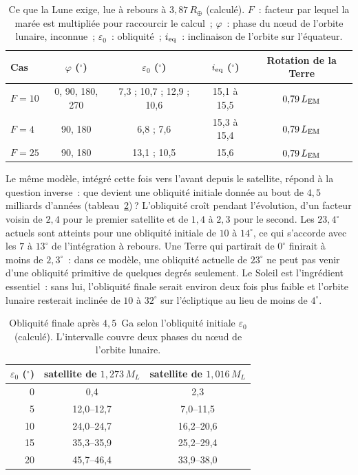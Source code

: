 \documentclass[11pt,a4paper]{article}
\newcommand{\Rt}{\ensuremath{R_\oplus}}
\newcommand{\ML}{\ensuremath{M_L}}
\newcommand{\LEM}{\ensuremath{L_{\rm EM}}}
\begin{document}
\begin{table}[htbp]
\centering
\caption{Ce que la Lune exige, lue à rebours à $3{,}87\,\Rt$ (calculé). $F$~: facteur par lequel la marée est multipliée pour raccourcir le calcul~; $\varphi$~: phase du nœud de l'orbite lunaire, inconnue~; $\varepsilon_0$~: obliquité~; $i_{\rm eq}$~: inclinaison de l'orbite sur l'équateur.\label{tab:retro}}
\small
\begin{tabular}{lcccc}
\toprule
Cas & $\varphi$ ($^\circ$) & $\varepsilon_0$ ($^\circ$) & $i_{\rm eq}$ ($^\circ$) & Rotation de la Terre \\
\midrule
$F=10$ & 0, 90, 180, 270 & 7,3 ; 10,7 ; 12,9 ; 10,6 & 15,1 à 15,5 & $0{,}79\,\LEM$ \\
$F=4$ & 90, 180 & 6,8 ; 7,6 & 15,3 à 15,4 & $0{,}79\,\LEM$ \\
$F=25$ & 90, 180 & 13,1 ; 10,5 & 15,6 & $0{,}79\,\LEM$ \\
\bottomrule
\end{tabular}
\end{table}

Le même modèle, intégré cette fois vers l'avant depuis le satellite, répond à la question inverse~: que devient une obliquité initiale donnée au bout de $4{,}5$ milliards d'années (tableau~\ref{tab:obl})\,? L'obliquité croît pendant l'évolution, d'un facteur voisin de $2{,}4$ pour le premier satellite et de $1{,}4$ à $2{,}3$ pour le second. Les $23{,}4^\circ$ actuels sont atteints pour une obliquité initiale de $10$ à $14^\circ$, ce qui s'accorde avec les $7$ à $13^\circ$ de l'intégration à rebours. Une Terre qui partirait de $0^\circ$ finirait à moins de $2{,}3^\circ$~: dans ce modèle, une obliquité actuelle de $23^\circ$ ne peut pas venir d'une obliquité primitive de quelques degrés seulement. Le Soleil est l'ingrédient essentiel~: sans lui, l'obliquité finale serait environ deux fois plus faible et l'orbite lunaire resterait inclinée de $10$ à $32^\circ$ sur l'écliptique au lieu de moins de $4^\circ$.

\begin{table}[htbp]
\centering
\caption{Obliquité finale après $4{,}5$~Ga selon l'obliquité initiale $\varepsilon_0$ (calculé). L'intervalle couvre deux phases du n\oe ud de l'orbite lunaire.\label{tab:obl}}
\small
\begin{tabular}{rcc}
\toprule
$\varepsilon_0$ ($^\circ$) & satellite de $1{,}273\,\ML$ & satellite de $1{,}016\,\ML$ \\
\midrule
0 & 0,4 & 2,3 \\
5 & 12,0--12,7 & 7,0--11,5 \\
10 & 24,0--24,7 & 16,2--20,6 \\
15 & 35,3--35,9 & 25,2--29,4 \\
20 & 45,7--46,4 & 33,9--38,0 \\
\bottomrule
\end{tabular}
\end{table}
\end{document}
